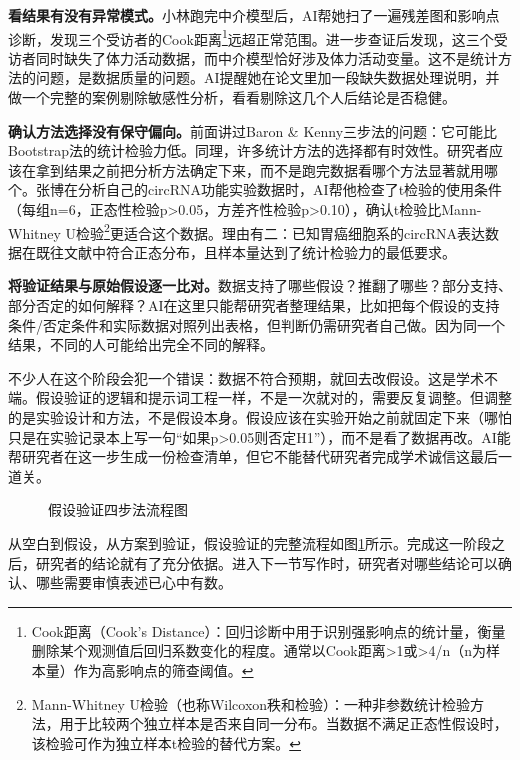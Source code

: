 \textbf{看结果有没有异常模式。}小林跑完中介模型后，AI帮她扫了一遍残差图和影响点诊断，发现三个受访者的Cook距离\footnote{Cook距离（Cook's Distance）：回归诊断中用于识别强影响点的统计量，衡量删除某个观测值后回归系数变化的程度。通常以Cook距离>1或>4/n（n为样本量）作为高影响点的筛查阈值。}远超正常范围。进一步查证后发现，这三个受访者同时缺失了体力活动数据，而中介模型恰好涉及体力活动变量。这不是统计方法的问题，是数据质量的问题。AI提醒她在论文里加一段缺失数据处理说明，并做一个完整的案例剔除敏感性分析，看看剔除这几个人后结论是否稳健。

\textbf{确认方法选择没有保守偏向。}前面讲过Baron \& Kenny三步法的问题：它可能比Bootstrap法的统计检验力低。同理，许多统计方法的选择都有时效性。研究者应该在拿到结果之前把分析方法确定下来，而不是跑完数据看哪个方法显著就用哪个。张博在分析自己的circRNA功能实验数据时，AI帮他检查了t检验的使用条件（每组n=6，正态性检验p>0.05，方差齐性检验p>0.10），确认t检验比Mann-Whitney U检验\footnote{Mann-Whitney U检验（也称Wilcoxon秩和检验）：一种非参数统计检验方法，用于比较两个独立样本是否来自同一分布。当数据不满足正态性假设时，该检验可作为独立样本t检验的替代方案。}更适合这个数据。理由有二：已知胃癌细胞系的circRNA表达数据在既往文献中符合正态分布，且样本量达到了统计检验力的最低要求。

\textbf{将验证结果与原始假设逐一比对。}数据支持了哪些假设？推翻了哪些？部分支持、部分否定的如何解释？AI在这里只能帮研究者整理结果，比如把每个假设的支持条件/否定条件和实际数据对照列出表格，但判断仍需研究者自己做。因为同一个结果，不同的人可能给出完全不同的解释。

\begin{critiquebox}
不少人在这个阶段会犯一个错误：数据不符合预期，就回去改假设。这是学术不端。假设验证的逻辑和提示词工程一样，不是一次就对的，需要反复调整。但调整的是实验设计和方法，不是假设本身。假设应该在实验开始之前就固定下来（哪怕只是在实验记录本上写一句``如果p>0.05则否定H1''），而不是看了数据再改。AI能帮研究者在这一步生成一份检查清单，但它不能替代研究者完成学术诚信这最后一道关。
\end{critiquebox}

\begin{figure}[H]
\centering
{}
\caption{假设验证四步法流程图}
\label{fig:ch5_11}
\end{figure}
\par

从空白到假设，从方案到验证，假设验证的完整流程如图\ref{fig:ch5_11}所示。完成这一阶段之后，研究者的结论就有了充分依据。进入下一节写作时，研究者对哪些结论可以确认、哪些需要审慎表述已心中有数。

